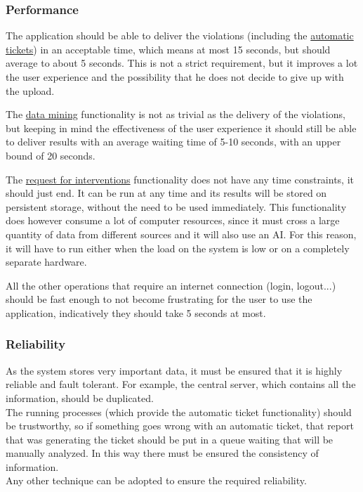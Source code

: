 \subsubsection{Performance}
    The application should be able to deliver the violations (including the
    \hyperref[sec:automatic_tickets]{automatic tickets}) in an acceptable time,
    which means at most 15 seconds, but should average to about 5 seconds.
    This is not a strict requirement, but it improves a lot the user experience and the possibility
    that he does not decide to give up with the upload.

    The 
    \hyperref[sec:data_mining]{data mining} 
    functionality is not as trivial as the delivery of the violations, but keeping in 
    mind the effectiveness of the user experience it should still be able to deliver results with an
    average waiting time of 5-10 seconds, with an upper bound of 20 seconds.

    The
    \hyperref[sec:request_for_interventions]{request for interventions}
    functionality does not have any time constraints, it should just end. It can be run at any time and
    its results will be stored on persistent storage, without the need to be used immediately.
    This functionality does however consume a lot of computer resources, since it must cross a large quantity
    of data from different sources and it will also use an AI. For this reason, it will have to run
    either when the load on the system is low or on a completely separate hardware.

    All the other operations that require an internet connection (login, logout...) should be fast enough
    to not become frustrating for the user to use the application, indicatively they should take 5 seconds at most.
    
\subsubsection{Reliability}
	As the system stores very important data, it must be ensured	that it is highly reliable and fault tolerant. For example, the	central	server,	which contains all the information, should be duplicated.\\The running processes (which provide the automatic ticket functionality) should be trustworthy, so if something goes wrong with an automatic ticket, that report that was generating the ticket should be put in a queue waiting that will be manually analyzed. In this way there must be ensured the consistency of information.\\Any other technique can be	adopted	to	ensure	the	required reliability.
    
